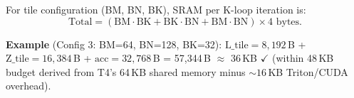For tile configuration (BM, BN, BK), SRAM per K-loop iteration is:
\[
    \text{Total} = (\text{BM} \cdot \text{BK} + \text{BK} \cdot \text{BN} + \text{BM} \cdot \text{BN}) \times 4 \text{ bytes}.
\]

\textbf{Example} (Config 3: BM=64, BN=128, BK=32): $\text{L\_tile} = 8{,}192$\,B + $\text{Z\_tile} = 16{,}384$\,B + $\text{acc} = 32{,}768$\,B = 57{,}344\,B $\approx$ 36\,KB $\checkmark$ (within 48\,KB budget derived from T4's 64\,KB shared memory minus ${\sim}16$\,KB Triton/CUDA overhead).
